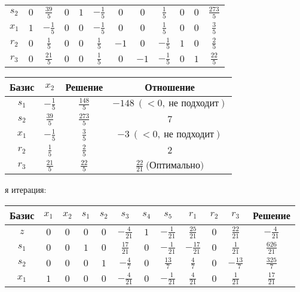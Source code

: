 \documentclass{article}%
\begin{document}
\begin{flushleft}
\begin{tabular}{|c|cccccccccc|c|}
$s_{2}$&$0$&$\frac{39}{5}$&$0$&$1$&$-\frac{1}{5}$&$0$&$0$&$\frac{1}{5}$&$0$&$0$&$\frac{273}{5}$\\%
$x_{1}$&$1$&$-\frac{1}{5}$&$0$&$0$&$-\frac{1}{5}$&$0$&$0$&$\frac{1}{5}$&$0$&$0$&$\frac{3}{5}$\\%
$r_{2}$&$0$&$\frac{1}{5}$&$0$&$0$&$\frac{1}{5}$&$-1$&$0$&$-\frac{1}{5}$&$1$&$0$&$\frac{2}{5}$\\%
$r_{3}$&$0$&$\frac{21}{5}$&$0$&$0$&$\frac{1}{5}$&$0$&$-1$&$-\frac{1}{5}$&$0$&$1$&$\frac{22}{5}$\\%
\hline%
\end{tabular}%
\newline%
\newline%
\newline%
\begin{tabular}{|cccc|}%
\hline%
Базис&$x_{2}$&Решение&Отношение\\%
\hline%
$s_{1}$&$-\frac{1}{5}$&$\frac{148}{5}$&$-148\: (< 0, \: \text{не подходит})$\\%
$s_{2}$&$\frac{39}{5}$&$\frac{273}{5}$&$7$\\%
$x_{1}$&$-\frac{1}{5}$&$\frac{3}{5}$&$-3\: (< 0, \: \text{не подходит})$\\%
$r_{2}$&$\frac{1}{5}$&$\frac{2}{5}$&$2$\\%
$r_{3}$&$\frac{21}{5}$&$\frac{22}{5}$&$\frac{22}{21}\: \text{(Оптимально)}$\\%
\hline%
\end{tabular}%
\newline%
\newline%
я итерация: %
\newline%
\newline%
\renewcommand{\arraystretch}{1.3}%
\begin{tabular}{|c|cccccccccc|c|}%
\hline%
Базис&$x_{1}$&$x_{2}$&$s_{1}$&$s_{2}$&$s_{3}$&$s_{4}$&$s_{5}$&$r_{1}$&$r_{2}$&$r_{3}$&Решение\\%
\hline%
$z$&$0$&$0$&$0$&$0$&$-\frac{4}{21}$&$1$&$-\frac{1}{21}$&$\frac{25}{21}$&$0$&$\frac{22}{21}$&$-\frac{4}{21}$\\%
\hline%
$s_{1}$&$0$&$0$&$1$&$0$&$\frac{17}{21}$&$0$&$-\frac{1}{21}$&$-\frac{17}{21}$&$0$&$\frac{1}{21}$&$\frac{626}{21}$\\%
$s_{2}$&$0$&$0$&$0$&$1$&$-\frac{4}{7}$&$0$&$\frac{13}{7}$&$\frac{4}{7}$&$0$&$-\frac{13}{7}$&$\frac{325}{7}$\\%
$x_{1}$&$1$&$0$&$0$&$0$&$-\frac{4}{21}$&$0$&$-\frac{1}{21}$&$\frac{4}{21}$&$0$&$\frac{1}{21}$&$\frac{17}{21}$\\%

\end{tabular}
\end{flushleft}
\end{document}
